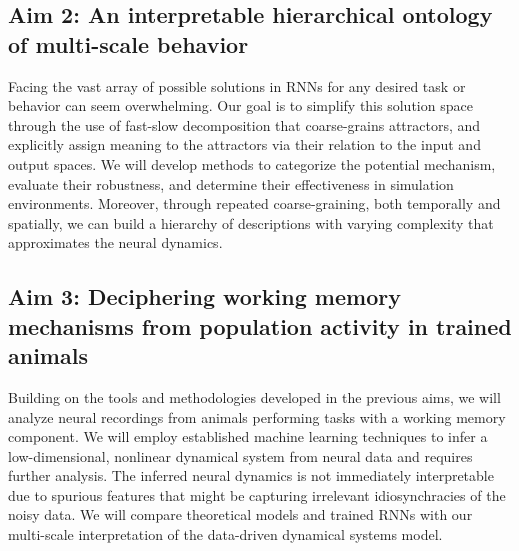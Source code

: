 \documentclass[12pt,letterpaper, onecolumn]{article}
\theoremstyle{definition}
\theoremstyle{remark}
\begin{document}
\subsection*{Aim 2: An interpretable hierarchical ontology of multi-scale behavior}
Facing the vast array of possible solutions in RNNs for any desired task or behavior can seem overwhelming.
Our goal is to simplify this solution space through the use of fast-slow decomposition that coarse-grains attractors, and explicitly assign meaning to the attractors via their relation to the input and output spaces.
We will develop methods to categorize the potential mechanism, evaluate their robustness, and determine their effectiveness in simulation environments.
Moreover, through repeated coarse-graining, both temporally and spatially, we can build a hierarchy of descriptions with varying complexity that approximates the neural dynamics.

\subsection*{Aim 3: Deciphering working memory mechanisms from population activity in trained animals}
Building on the tools and methodologies developed in the previous aims, we will analyze neural recordings from animals performing tasks with a working memory component.
We will employ established machine learning techniques to infer a low-dimensional, nonlinear dynamical system from  neural data and requires further analysis.
The inferred neural dynamics is not immediately interpretable due to spurious features that might be capturing irrelevant idiosynchracies of the noisy data.
We will compare theoretical models and trained RNNs with our multi-scale interpretation of the data-driven dynamical systems model.
\end{document}
